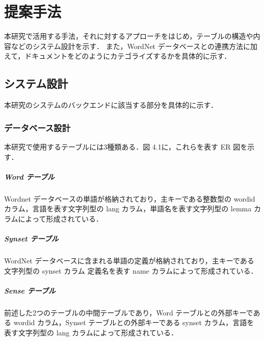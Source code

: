 \chapter{提案手法}
\label{ch:app}
\quad

本研究で活用する手法，それに対するアプローチをはじめ，テーブルの構造や内容などのシステム設計を示す．
また，WordNet データベースとの連携方法に加えて，ドキュメントをどのようにカテゴライズするかを具体的に示す．

\section{システム設計}
\label{sec:app_design}
本研究のシステムのバックエンドに該当する部分を具体的に示す．
\subsection{データベース設計}
\label{subsec:table}

本研究で使用するテーブルには3種類ある．図 4.1に，これらを表す ER 図を示す．

\paragraph{Word テーブル}
Wordnet データベースの単語が格納されており，主キーである整数型の wordid カラム，言語を表す文字列型の lang カラム，単語名を表す文字列型の lemma カラムによって形成されている．

\paragraph{Synset テーブル}
WordNet データベースに含まれる単語の定義が格納されており，主キーである文字列型の synset カラム 定義名を表す name カラムによって形成されている．

\paragraph{Sense テーブル}
前述した2つのテーブルの中間テーブルであり，Word テーブルとの外部キーである wordid カラム，Synset テーブルとの外部キーである synset カラム，言語を表す文字列型の lang カラムによって形成されている．

\clearpage

